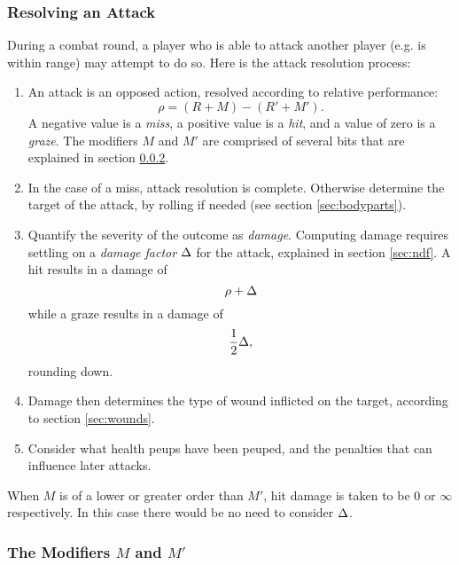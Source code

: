 \documentclass[12pt]{article}
\newcommand{\notes}[1]{{\color{Tan} #1}}
\newcommand{\emdex}[1]{\emph{#1}\index{#1}}
\begin{document}
\subsubsection{Resolving an Attack}
During a combat round, a player who is able to attack another player (e.g. is within range) may attempt to do so.
Here is the attack resolution process:
\vspace{-1em}\begin{enumerate}
\item
An attack is an opposed action, resolved according to relative performance:
$$ \rho = (R + M) - (R' + M'). $$
A negative value is a \emdex{miss}, a positive value is a \emdex{hit}, and a value of zero is a \emdex{graze}.
The modifiers $M$ and $M'$ are comprised of several bits that are explained in section \ref{sec:sitmod}.
\item
In the case of a miss, attack resolution is complete.
Otherwise determine the target of the attack, by rolling if needed (see section \ref{sec:bodyparts}).
\item
Quantify the severity of the outcome as \emdex{damage}.
Computing damage requires settling on a \emph{damage factor} $\Delta$ for the attack, explained in section \ref{sec:ndf}.
A hit results in a damage of
$$ \rho + \Delta $$
while a graze results in a damage of
$$ \frac{1}{2} \Delta, $$
rounding down.
\item
Damage then determines the type of wound inflicted on the target, according to section \ref{sec:wounds}.
\item
Consider what health \notes{peups have been peuped}, and the penalties that can influence later attacks.
\end{enumerate}

When $M$ is of a lower or greater order than $M'$, hit damage is taken to be $0$ or $\infty$ respectively.
In this case there would be no need to consider $\Delta$.


\subsubsection{The Modifiers $M$ and $M'$}\label{sec:sitmod}
\end{document}

